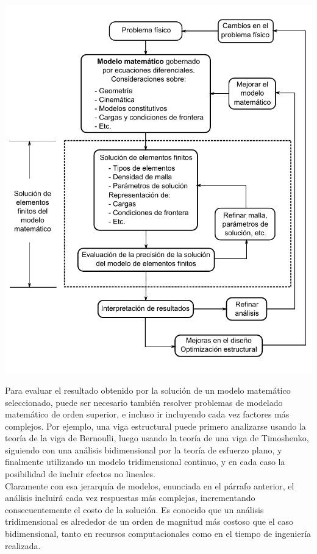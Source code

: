 \begin{center}
\includegraphics[scale=0.85]{src/ch2/elemento_finito_diagrama}
\label{fig:fem_diagram}
\end{center}

Para evaluar el resultado obtenido por la solución de un modelo matemático seleccionado, 
puede ser necesario también resolver problemas de modelado matemático de orden superior, 
e incluso ir incluyendo cada vez factores más complejos. Por ejemplo, una viga estructural 
puede primero analizarse usando la teoría de la viga de Bernoulli, luego usando 
la teoría de una viga de Timoshenko, siguiendo con una análisis bidimensional por la 
teoría de esfuerzo plano, y finalmente utilizando un modelo tridimensional continuo, 
y en cada caso la posibilidad de incluir efectos no lineales.\\

Claramente con esa jerarquía de modelos, enunciada en el párrafo anterior, el análisis 
incluirá cada vez respuestas más complejas, incrementando consecuentemente el costo de 
la solución. Es conocido que un análisis tridimensional es alrededor de un orden de 
magnitud más costoso que el caso bidimensional, tanto en recursos computacionales 
como en el tiempo de ingeniería realizada.

